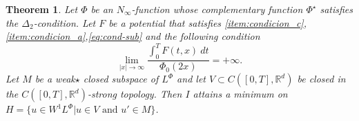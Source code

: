 \documentclass[twoside]{article}
\newtheorem{thm}{Theorem}[section]
\theoremstyle{remark}
\newcommand{\lphi}{L^{\Phi}}
\newcommand{\wphi}{W^{1}\lphi}
\newcommand{\rr}{\mathbb{R}}
\begin{document}
\begin{thm}\label{coercitividad-r}
  Let $\Phi$ be an $N_{\infty}$-function whose complementary function $\Phi^{\star}$ satisfies the $\Delta_2$-condition. Let $F$ be a potential that satisfies \ref{item:condicion_c}, \ref{item:condicion_a},\eqref{eq:cond-sub} and the following condition
\begin{equation}\label{eq:propiedad-coercividad-phi0}
\lim_{|x|\to\infty}\frac{\int_{0}^{T}F(t,x)\ dt}{\Phi_0(2x)}=+\infty.
\end{equation}
Let $M$ be a weak${\star}$ closed subspace of $\lphi$ and let $V\subset C([0,T],\rr^d)$ be closed in the $C([0,T],\rr^d)$-strong topology. Then  $I$ attains a minimum on $H=\{u\in \wphi | u\in V\text{ and } u'\in M\}$.
\end{thm}
\end{document}
